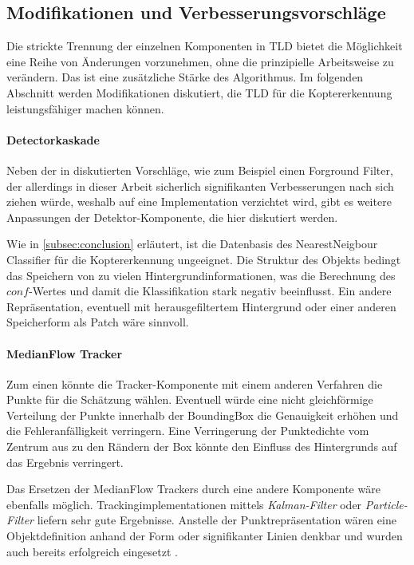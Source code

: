 \subsection{Modifikationen und Verbesserungsvorschläge}
	Die strickte Trennung der einzelnen Komponenten in TLD bietet die Möglichkeit eine Reihe von Änderungen vorzunehmen, ohne die prinzipielle Arbeitsweise zu verändern. Das ist eine zusätzliche Stärke des Algorithmus. Im folgenden Abschnitt werden Modifikationen diskutiert, die TLD für die Koptererkennung leistungsfähiger machen können.

	\paragraph{Detectorkaskade}
		Neben der in \cite{TLD} diskutierten Vorschläge, wie zum Beispiel einen Forground Filter, der allerdings in dieser Arbeit sicherlich signifikanten Verbesserungen nach sich ziehen würde, weshalb auf eine Implementation verzichtet wird, gibt es weitere Anpassungen der Detektor-Komponente, die hier diskutiert werden.

		Wie in \ref{subsec:conclusion} erläutert, ist die Datenbasis des NearestNeigbour Classifier für die Koptererkennung ungeeignet. Die Struktur des Objekts bedingt das Speichern von zu vielen Hintergrundinformationen, was die Berechnung des $conf$-Wertes und damit die Klassifikation stark negativ beeinflusst. Ein andere Repräsentation, eventuell mit herausgefiltertem Hintergrund oder einer anderen Speicherform als Patch wäre sinnvoll.

	\paragraph{MedianFlow Tracker}
		Zum einen könnte die Tracker-Komponente mit einem anderen Verfahren die Punkte für die Schätzung wählen. Eventuell würde eine nicht gleichförmige Verteilung der Punkte innerhalb der BoundingBox die Genauigkeit erhöhen und die Fehleranfälligkeit verringern. Eine Verringerung der Punktedichte vom Zentrum aus zu den Rändern der Box könnte den Einfluss des Hintergrunds auf das Ergebnis verringert.

		Das Ersetzen der MedianFlow Trackers durch eine andere Komponente wäre ebenfalls möglich. Trackingimplementationen mittels {\em Kalman-Filter} \cite{KAF} oder {\em Particle-Filter} \cite{PAF} liefern sehr gute Ergebnisse. Anstelle der Punktrepräsentation wären eine Objektdefinition anhand der Form oder signifikanter Linien denkbar und wurden auch bereits erfolgreich eingesetzt \cite{AVT}.

